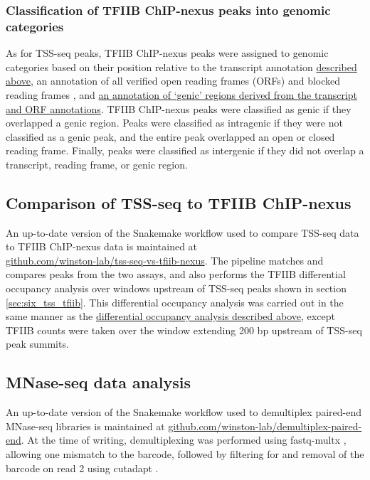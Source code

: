 \subsubsection{Classification of TFIIB ChIP-nexus peaks into genomic categories}
\label{subsubsec:tfiib_peak_classification}
As for TSS-seq peaks, TFIIB ChIP-nexus peaks were assigned to genomic categories based on their position relative to the transcript annotation \hyperref[subsubsec:tss_reannotation]{described above}, an annotation of all verified open reading frames (ORFs) and blocked reading frames \citep{engel2014}, and \hyperref[subsubsec:tss_peak_classification]{an annotation of `genic' regions derived from the transcript and ORF annotations}.
TFIIB ChIP-nexus peaks were classified as genic if they overlapped a genic region.
Peaks were classified as intragenic if they were not classified as a genic peak, and the entire peak overlapped an open or closed reading frame.
Finally, peaks were classified as intergenic if they did not overlap a transcript, reading frame, or genic region.

\subsection{Comparison of TSS-seq to TFIIB ChIP-nexus}

An up-to-date version of the Snakemake \citep{koster2012} workflow used to compare TSS-seq data to TFIIB ChIP-nexus data is maintained at\\\href{https://github.com/winston-lab/tss-seq-vs-tfiib-nexus}{github.com/winston-lab/tss-seq-vs-tfiib-nexus}.
The pipeline matches and compares peaks from the two assays, and also performs the TFIIB differential occupancy analysis over windows upstream of TSS-seq peaks shown in section \ref{sec:six_tss_tfiib}.
This differential occupancy analysis was carried out in the same manner as the \hyperref[subsubsec:nexus_differential_occupancy]{differential occupancy analysis described above}, except TFIIB counts were taken over the window extending 200 bp upstream of TSS-seq peak summits.

\subsection{MNase-seq data analysis}

An up-to-date version of the Snakemake \citep{koster2012} workflow used to demultiplex paired-end MNase-seq libraries is maintained at \href{https://github.com/winston-lab/demultiplex-paired-end}{github.com/winston-lab/demultiplex-paired-end}.
At the time of writing, demultiplexing was performed using fastq-multx \citep{aronesty2013}, allowing one mismatch to the barcode, followed by filtering for and removal of the barcode on read 2 using cutadapt \citep{martin2011}.

